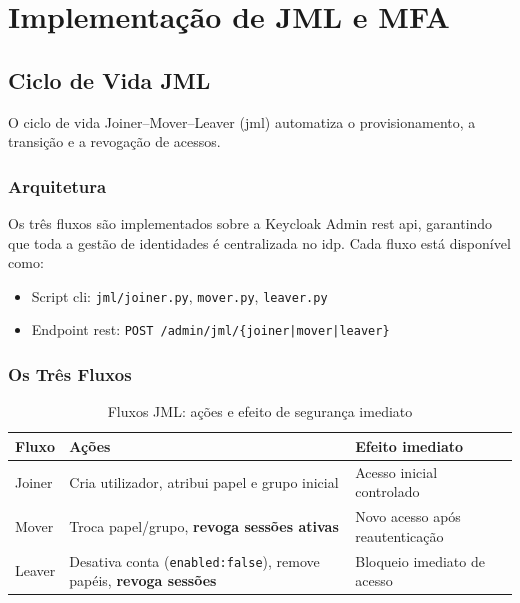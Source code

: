 \chapter{Implementação de JML e MFA}
\label{chap:jml_mfa}

\section{Ciclo de Vida JML}

O ciclo de vida Joiner–Mover–Leaver (\gls{jml}) automatiza o provisionamento, a transição e a revogação de acessos.

\subsection{Arquitetura}

Os três fluxos são implementados sobre a Keycloak Admin \gls{rest} \gls{api}, garantindo que toda a gestão de identidades é centralizada no \gls{idp}. Cada fluxo está disponível como:
\begin{itemize}
  \item Script \gls{cli}: \texttt{jml/joiner.py}, \texttt{mover.py}, \texttt{leaver.py}
  \item Endpoint \gls{rest}: \texttt{POST /admin/jml/\{joiner|mover|leaver\}}
\end{itemize}

\subsection{Os Três Fluxos}

\begin{table}[h!]
\centering
\caption{Fluxos JML: ações e efeito de segurança imediato}
\label{tab:jml}
\begin{tabularx}{\textwidth}{|l|X|l|}
\hline
\textbf{Fluxo} & \textbf{Ações} & \textbf{Efeito imediato} \\ \hline
Joiner & Cria utilizador, atribui papel e grupo inicial & Acesso inicial controlado \\ \hline
Mover & Troca papel/grupo, \textbf{revoga sessões ativas} & Novo acesso após reautenticação \\ \hline
Leaver & Desativa conta (\texttt{enabled:false}), remove papéis, \textbf{revoga sessões} & Bloqueio imediato de acesso \\ \hline
\end{tabularx}
\end{table}

